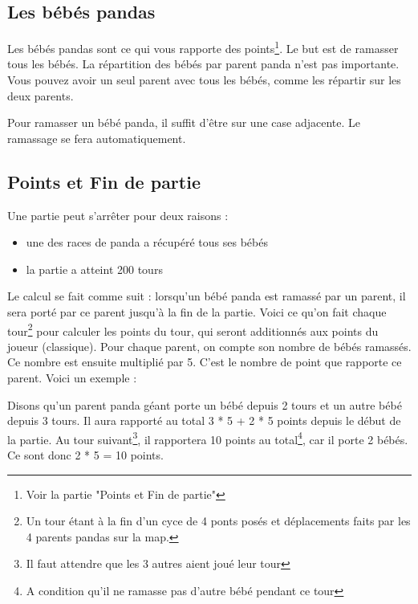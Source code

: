 
\subsection{Les bébés pandas}
Les bébés pandas sont ce qui vous rapporte des points\footnote{Voir la partie "Points et Fin de partie"}. Le but est de ramasser tous les bébés. La répartition des bébés par parent panda n'est pas importante. Vous pouvez avoir un seul parent avec tous les bébés, comme les répartir sur les deux parents.

Pour ramasser un bébé panda, il suffit d'être sur une case adjacente. Le ramassage se fera automatiquement.

\subsection{Points et Fin de partie}
Une partie peut s'arrêter pour deux raisons :
\begin{itemize}
    \item une des races de panda a récupéré tous ses bébés
    \item la partie a atteint 200 tours
\end{itemize}

Le calcul se fait comme suit : lorsqu'un bébé panda est ramassé par un parent, il sera porté par ce parent jusqu'à la fin de la partie. Voici ce qu'on fait chaque tour\footnote{Un tour étant à la fin d'un cyce de 4 ponts posés et déplacements faits par les 4 parents pandas sur la map.} pour calculer les points du tour, qui seront additionnés aux points du joueur (classique). Pour chaque parent, on compte son nombre de bébés ramassés. Ce nombre est ensuite multiplié par 5. C'est le nombre de point que rapporte ce parent. Voici un exemple :

Disons qu'un parent panda géant porte un bébé depuis 2 tours et un autre bébé depuis 3 tours. Il aura rapporté au total 3 * 5 + 2 * 5 points depuis le début de la partie. Au tour suivant\footnote{Il faut attendre que les 3 autres aient joué leur tour}, il rapportera 10 points au total\footnote{A condition qu'il ne ramasse pas d'autre bébé pendant ce tour}, car il porte 2 bébés. Ce sont donc 2 * 5 = 10 points.

